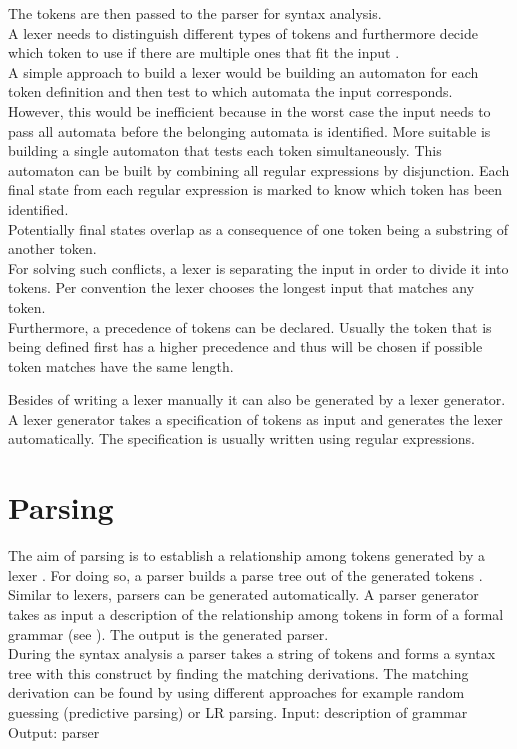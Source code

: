 The tokens are then passed to the parser for syntax analysis.\\
A lexer needs to distinguish different types of tokens and furthermore decide which token to use if there are multiple ones that fit the input \cite{Mogensen.2017}.\\
A simple approach to build a lexer would be building an automaton for each token definition and then test to which automata the input corresponds.\\
However, this would be inefficient because in the worst case the input needs to pass all automata before the belonging automata is identified.
More suitable is building a single automaton that tests each token simultaneously.
This automaton can be built by combining all regular expressions by disjunction.
Each final state from each regular expression is marked to know which token has been identified.\\
Potentially final states overlap as a consequence of one token being a substring of another token. \\
For solving such conflicts, a lexer is separating the input in order to divide it into tokens.
Per convention the lexer chooses the longest input that matches any token. \cite{Mogensen.2017} \\
Furthermore, a precedence of tokens can be declared. Usually the token that is being defined first has a higher precedence and thus will be chosen if possible token matches have the same length. \cite{Mogensen.2017}

Besides of writing a lexer manually it can also be generated by a lexer generator. A lexer generator takes a specification of tokens as input and generates the lexer automatically. 
The specification is usually written using regular expressions. 

\section{Parsing}\label{sec:BackgroundParser}

The aim of parsing is to establish a relationship among tokens generated by a lexer \cite{LexYacc.1992}. For doing so, a parser builds a parse tree out of the generated tokens \cite{Mogensen.2017}.\\
Similar to lexers, parsers can be generated automatically.
A parser generator takes as input a description of the relationship among tokens in form of a formal grammar (see ). The output is the generated parser. \cite{LexYacc.1992}\\
During the syntax analysis a parser takes a string of tokens and forms a syntax tree with this construct by finding the matching derivations. The matching derivation can be found by using different approaches for example random guessing (predictive parsing) or LR parsing.
Input: description of grammar \cite{LexYacc.1992}
Output: parser \cite{LexYacc.1992}

